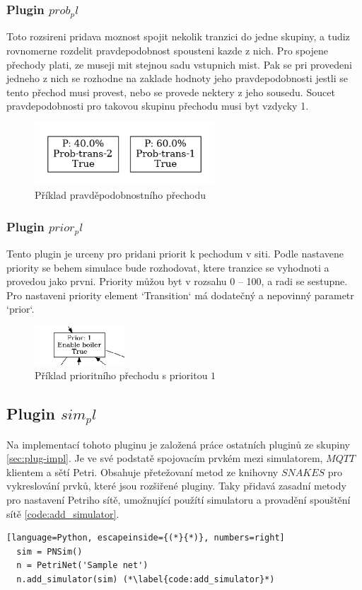 \subsubsection{Plugin $prob_pl$}
\label{subsec:prob_pl}
Toto rozsireni pridava moznost spojit nekolik tranzici do jedne skupiny, a tudiz rovnomerne rozdelit pravdepodobnost spousteni kazde z nich. Pro spojene přechody plati, ze museji mit stejnou sadu vstupnich mist. Pak se pri provedeni jedneho z nich se rozhodne na zaklade hodnoty jeho pravdepodobnosti jestli se tento přechod musi provest, nebo se provede nektery z jeho sousedu. Soucet pravdepodobnosti pro takovou skupinu přechodu musi byt vzdycky 1.
\begin{figure}[hbt]
  \centering
  \includegraphics[width=0.6\textwidth]{obrazky-figures/prob-transition.png}
  \caption{Příklad pravděpodobnostního přechodu}
  \label{timed-transition}
\end{figure}

\subsubsection{Plugin $prior_pl$}
\label{subsec:prior_pl}
Tento plugin je urceny pro pridani priorit k pechodum v siti. Podle nastavene priority se behem simulace bude rozhodovat, ktere tranzice se vyhodnoti a provedou jako prvni. Priority můžou byt v rozsahu 0 -- 100, a radi se sestupne. Pro nastaveni priority element `Transition` má dodatečný a nepovinný parametr `prior`. 
\begin{figure}[hbt]
  \centering
  \includegraphics[width=0.3\textwidth]{obrazky-figures/prior-transition.png}
  \caption{Příklad prioritního přechodu s prioritou $1$}
  \label{timed-transition}
\end{figure}

\subsection{Plugin $sim_pl$}
\label{sec:aplikace-mqtt}
Na implementací tohoto pluginu je založená práce ostatních pluginů ze skupiny \ref{sec:plug-impl}. Je ve své podstatě spojovacím prvkém mezi simulatorem, $MQTT$ klientem a sětí Petri. Obsahuje přetežovaní metod ze knihovny $SNAKES$ pro vykreslování prvků, které jsou rozšiřené pluginy. Taky přidavá zasadní metody pro nastavení Petriho sítě, umožnující použítí simulatoru a provadění spouštění sítě \ref{code:add_simulator}.
\begin{lstlisting}[language=Python, escapeinside={(*}{*)}, numbers=right]
  sim = PNSim()
  n = PetriNet('Sample net')
  n.add_simulator(sim) (*\label{code:add_simulator}*)
\end{lstlisting}

